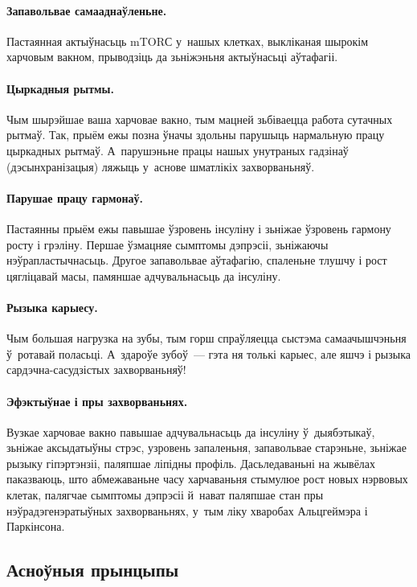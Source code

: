 \paragraph{Запавольвае самааднаўленьне.}\!
Пастаянная актыўнасьць mTORС у~нашых клетках, выкліканая шырокім харчовым вакном, прыводзіць да зьніжэньня актыўнасьці аўтафагіі.

\paragraph{Цыркадныя рытмы.}
Чым шырэйшае ваша харчовае вакно, тым мацней зьбіваецца работа сутачных рытмаў. Так, прыём ежы позна ўначы здольны парушыць нармальную працу цыркадных рытмаў. А~парушэньне працы нашых унутраных гадзінаў (дэсынхранізацыя) ляжыць у~аснове шматлікіх захворваньняў.

\paragraph{Парушае працу гармонаў.}
Пастаянны прыём ежы павышае ўзровень інсуліну і зьніжае ўзровень гармону росту і грэліну. Першае ўзмацняе сымптомы дэпрэсіі, зьніжаючы нэўрапластычнасьць. Другое запавольвае аўтафагію, спаленьне тлушчу і рост цягліцавай масы, памяншае адчувальнасьць да інсуліну.

\paragraph{Рызыка карыесу.}
Чым большая нагрузка на зубы, тым горш спраўляецца сыстэма самаачышчэньня ў~ротавай поласьці. А~здароўе зубоў~--- гэта ня толькі карыес, але яшчэ і рызыка сардэчна-сасудзістых захворваньняў!

\paragraph{Эфэктыўнае і пры захворваньнях.}
Вузкае харчовае вакно павышае адчувальнасьць да інсуліну ў~дыябэтыкаў, зьніжае аксыдатыўны стрэс, узровень запаленьня, запавольвае старэньне, зьніжае рызыку гіпэртэнзіі, паляпшае ліпідны профіль. Дасьледаваньні на жывёлах паказваюць, што абмежаваньне часу харчаваньня стымулюе рост новых нэрвовых клетак, палягчае сымптомы дэпрэсіі й~нават паляпшае стан пры нэўрадэгенэратыўных захворваньнях, у~тым ліку хваробах Альцгеймэра і Паркінсона.

\subsection{Асноўныя прынцыпы}


